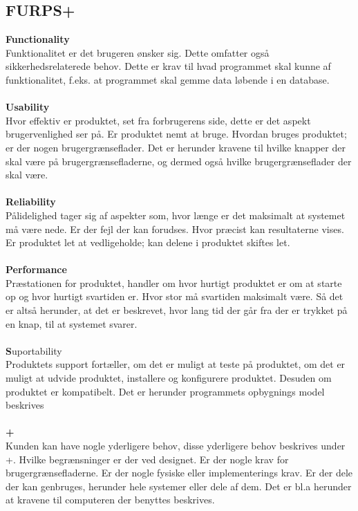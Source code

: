 \subsection{FURPS+}
\textbf{Functionality}\\
Funktionalitet er det brugeren ønsker sig. Dette omfatter også sikkerhedsrelaterede behov. Dette er krav til hvad programmet skal kunne af funktionalitet, f.eks. at programmet skal gemme data løbende i en database.\\\\
\textbf{Usability}\\
Hvor effektiv er produktet, set fra forbrugerens side, dette er det aspekt brugervenlighed ser på. Er produktet nemt at bruge. Hvordan bruges produktet; er der nogen brugergrænseflader. Det er herunder kravene til hvilke knapper der skal være på brugergrænsefladerne, og dermed også hvilke brugergrænseflader der skal være.\\\\
\textbf{Reliability}\\
Pålidelighed tager sig af aspekter som, hvor længe er det maksimalt at systemet må være nede. Er der fejl der kan forudses. Hvor præcist kan resultaterne vises. Er produktet let at vedligeholde; kan delene i produktet skiftes let.\\\\
\textbf{Performance}\\
Præstationen for produktet, handler om hvor hurtigt produktet er om at starte op og hvor hurtigt svartiden er. Hvor stor må svartiden maksimalt være. Så det er altså herunder, at det er beskrevet, hvor lang tid der går fra der er trykket på en knap, til at systemet svarer. \\\\
\textbf{S}uportability\\
Produktets support fortæller, om det er muligt at teste på produktet, om det er muligt at udvide produktet, installere og konfigurere produktet. Desuden om produktet er kompatibelt. Det er herunder programmets opbygnings model beskrives\\\\
\textbf{+}\\
Kunden kan have nogle yderligere behov, disse yderligere behov beskrives under +. Hvilke begrænsninger er der ved designet. Er der nogle krav for brugergrænsefladerne. Er der nogle fysiske eller implementerings krav. Er der dele der kan genbruges, herunder hele systemer eller dele af dem. Det er bl.a herunder at kravene til computeren der benyttes beskrives. \cite{furps}\\

